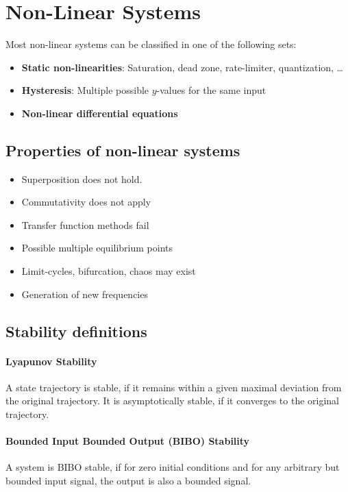 
\section{Non-Linear Systems}
Most non-linear systems can be classified in one of the following sets:
\begin{itemize}
    \item \textbf{Static non-linearities}: Saturation, dead zone, rate-limiter, quantization, \dots
    \item \textbf{Hysteresis}: Multiple possible $y$-values for the same input
    \item \textbf{Non-linear differential equations}
\end{itemize}

\subsection{Properties of non-linear systems}
\begin{multicols}{2}
\begin{itemize}
    \item Superposition does not hold.
    \item Commutativity does not apply
    \item Transfer function methods fail
    \item Possible multiple equilibrium points
    \item Limit-cycles, bifurcation, chaos may exist
    \item Generation of new frequencies
\end{itemize}
\end{multicols}

\subsection{Stability definitions}
\paragraph{Lyapunov Stability}
A state trajectory is stable, if it remains within a given maximal deviation from the original trajectory.
It is asymptotically stable, if it converges to the original trajectory.

\paragraph{Bounded Input Bounded Output (BIBO) Stability}
A system is BIBO stable, if for zero initial conditions and for any arbitrary but bounded input
signal, the output is also a bounded signal.

